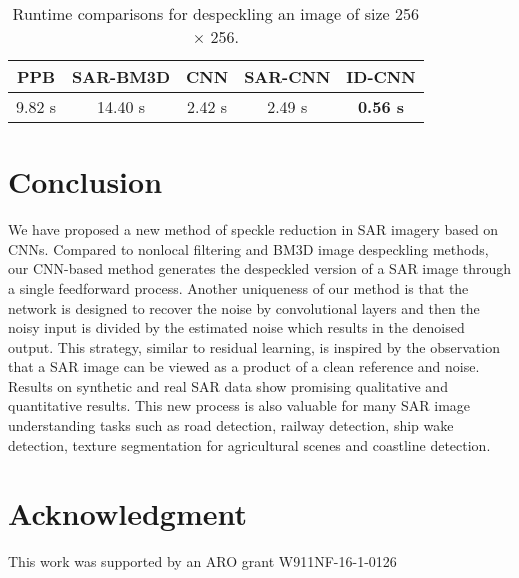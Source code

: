 \documentclass[journal]{IEEEtran}
\begin{document}
\begin{table}[htp!]
	\renewcommand{\arraystretch}{1.3}
	\caption{Runtime comparisons for despeckling an image of size 256 $\times$ 256.}
	\centering
	\begin{tabular}{c|c|c|c|c}
		\hline
		\hline
		PPB & SAR-BM3D & CNN & SAR-CNN &ID-CNN \\
		\hline
		
		9.82 s & 14.40 s & 2.42 s & 2.49 s & \textbf{0.56 s}\\
		
		\hline
		\hline
	\end{tabular}
	\label{tab:runtime}
\end{table}


\section{Conclusion}\label{sec:con}
We have proposed a new method of speckle reduction in SAR imagery based on CNNs. Compared to nonlocal filtering and BM3D image despeckling methods, our CNN-based method generates the despeckled version of a SAR image through a single feedforward process. Another uniqueness of our method is that the network is designed to recover the noise by convolutional layers and then the noisy input is divided by the estimated noise which results in the denoised output. This strategy, similar to residual learning, is inspired by the observation that a SAR image can be viewed as a product of a clean reference and noise. Results on synthetic and real SAR data show promising qualitative and quantitative results. This new process is also valuable for many SAR image understanding tasks such as road detection, railway detection, ship wake detection, texture segmentation for agricultural scenes and coastline detection.


\section*{Acknowledgment}
This work was supported by an ARO grant W911NF-16-1-0126




\end{document}
